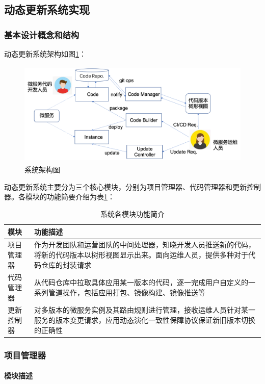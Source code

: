 \documentclass[a4paper]{article}
\theoremstyle{definition}
\begin{document}
\subsection{动态更新系统实现}\label{section:MsDymEvo}

\subsubsection{基本设计概念和结构}
动态更新系统架构如图\ref{fig:sys_arch}：
\begin{figure}[!ht]
 \centering
 \includegraphics[height=5cm]{images/arch.png}
 \caption{系统架构图}
 \label{fig:sys_arch}
\end{figure}

动态更新系统主要分为三个核心模块，分别为项目管理器、代码管理器和更新控制器。各模块的功能简要介绍为表\ref{tab:func}：
\begin{table}[!htbp]
\centering
\begin{tabular}{p{5cm}p{8cm}}
  \toprule
  模块& 功能描述 \\
  \midrule
  项目管理器& 作为开发团队和运营团队的中间处理器，知晓开发人员推送新的代码，将新的代码版本以树形视图显示出来。面向运维人员，提供多种对于代码仓库的封装请求  \\
  \midrule
  代码管理器& 从代码仓库中拉取具体应用某一版本的代码，逐一完成用户自定义的一系列管道操作，包括应用打包、镜像构建、镜像推送等  \\
  \midrule
  更新控制器& 对多版本的微服务实例及其路由规则进行管理，接收运维人员针对某一服务的版本变更请求，应用动态演化一致性保障协议保证新旧版本切换的正确性 \\
  \bottomrule
\end{tabular}
\caption{系统各模块功能简介}
\label{tab:func}
\end{table}

\subsubsection{项目管理器}
\paragraph{模块描述}\mbox{}\\
\end{document}
